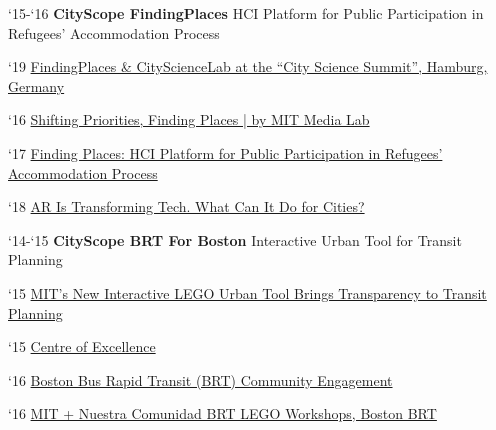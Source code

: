 \begin{tablist}
    \item[`15-`16] \tab \textbf{CityScope FindingPlaces} {HCI Platform for Public Participation in Refugees' Accommodation Process}

    \begin{tablist}

        \item[`19] \tab \href{https://www.youtube.com/watch?v=PZg6A_A65lQ}{FindingPlaces \& CityScienceLab at the “City Science Summit”, Hamburg, Germany}

        \item[`16] \tab  \href{https://medium.com/mit-media-lab/shifting-priorities-finding-places-9ad3bdbe38b8}{Shifting Priorities, Finding Places | by MIT Media Lab}

        \item[`17] \tab \href{https://www.media.mit.edu/publications/finding-places/}{Finding Places: HCI Platform for Public Participation in Refugees’ Accommodation Process}

        \item[`18] \tab  \href{https://datasmart.ash.harvard.edu/news/article/ar-transforming-tech-what-can-it-do-cities}{AR Is Transforming Tech. What Can It Do for Cities?}

    \end{tablist}


    \item[`14-`15] \tab \textbf{CityScope BRT For Boston} {Interactive Urban Tool for Transit Planning}

    \begin{tablist}

        \item[`15] \tab  \href{https://www.bloomberg.com/news/articles/2015-10-16/mit-s-new-interactive-lego-urban-tool-brings-transparency-to-transit-planning}
        {MIT's New Interactive LEGO Urban Tool Brings Transparency to Transit Planning}

        \item[`15] \tab  \href{http://www.brt.cl/new-tools-for-a-new-era-of-open-transportation-planning/}
        {Centre of Excellence}

        \item[`16] \tab  \href{https://www.media.mit.edu/projects/CityscopeBostonBRT/overview/}
        {Boston Bus Rapid Transit (BRT) Community Engagement}

        \item[`16] \tab  \href{http://www.bostonbrt.org/mit-nuestra-comunidad-brt-lego-workshops}
        {MIT + Nuestra Comunidad BRT LEGO Workshops, Boston BRT}


\end{tablist}
\end{tablist}
